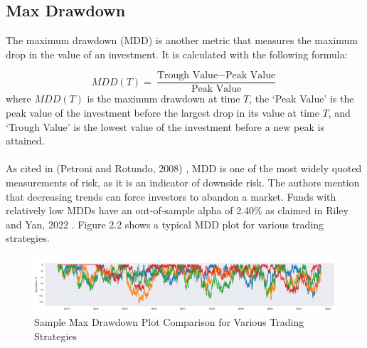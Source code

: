 \subsection{Max Drawdown}

The maximum drawdown (MDD) is another metric that measures the maximum drop in the value of an investment. It is calculated with the following formula:

\begin{equation*}
    MDD(T) = \dfrac{\text{Trough Value} - \text{Peak Value}}{\text{Peak Value}}
\end{equation*}
where $MDD(T)$ is the maximum drawdown at time $T$, the `Peak Value' is the peak value of the investment before the largest drop in its value at time $T$, and `Trough Value' is the lowest value of the investment before a new peak is attained. \\ \\
As cited in (Petroni and Rotundo, 2008) \cite{PETRONI20083942}, MDD is one of the most widely quoted measurements of risk, as it is an indicator of downside risk. The authors mention that decreasing trends can force investors to abandon a market. Funds with relatively low MDDs have an out-of-sample alpha of 2.40\% as claimed in Riley and Yan, 2022 \cite{max_drawdown}. Figure 2.2 shows a typical MDD plot for various trading strategies.

\begin{figure}[h]
    \centering
    \includegraphics[scale=0.25]{background/drawdown.png}
    \caption{Sample Max Drawdown Plot Comparison for Various Trading Strategies}
    \label{fig:my_label}
\end{figure}

